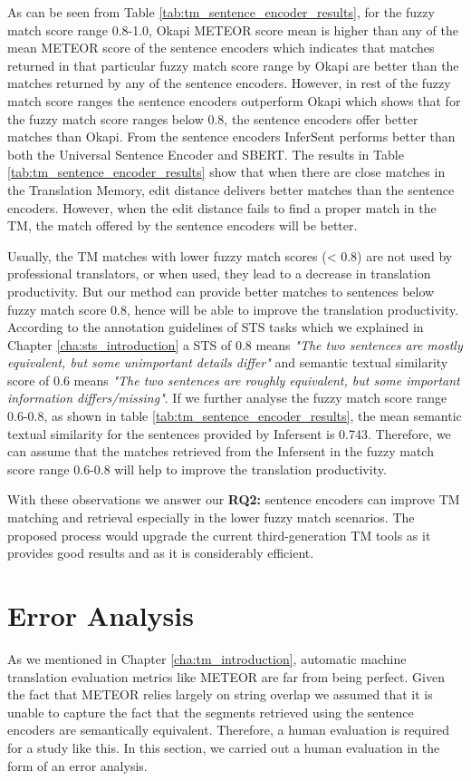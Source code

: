 As can be seen from Table \ref{tab:tm_sentence_encoder_results}, for the fuzzy match score range 0.8-1.0, Okapi METEOR score mean is higher than any of the mean METEOR score of the sentence encoders which indicates that matches returned in that particular fuzzy match score range by Okapi are better than the matches returned by any of the sentence encoders. However, in rest of the fuzzy match score ranges the sentence encoders outperform Okapi which shows that for the fuzzy match score ranges below 0.8, the sentence encoders offer better matches than Okapi. From the sentence encoders InferSent performs better than both the Universal Sentence Encoder and SBERT. The results in Table \ref{tab:tm_sentence_encoder_results} show that when there are close matches in the Translation Memory, edit distance delivers better matches than the sentence encoders. However, when the edit distance fails to find a proper match in the TM, the match offered by the sentence encoders will be better. 

Usually, the TM matches with lower fuzzy match scores (< 0.8) are not used by professional translators, or when used, they lead to a decrease in translation productivity. But our method can provide better matches to sentences below fuzzy match score 0.8, hence will be able to improve the translation productivity. According to the annotation guidelines of STS tasks which we explained in Chapter \ref{cha:sts_introduction} a STS of 0.8 means \textit{"The two sentences are mostly equivalent, but some unimportant details differ"} and semantic textual similarity score of 0.6 means \textit{"The two sentences are roughly equivalent, but some
important information differs/missing"}. If we further analyse the fuzzy match score range 0.6-0.8, as shown in table \ref{tab:tm_sentence_encoder_results}, the mean semantic textual similarity for the sentences provided by Infersent is 0.743. Therefore, we can assume that the matches retrieved from the Infersent in the fuzzy match score range 0.6-0.8 will help to improve the translation productivity.


With these observations we answer our \textbf{RQ2:} sentence encoders can improve TM matching and retrieval especially in the lower fuzzy match scenarios. The proposed process would upgrade the current third-generation TM tools as it provides good results and as it is considerably efficient.


\section{Error Analysis}
\label{sec:tm_sentence_encoders_error}
As we mentioned in Chapter \ref{cha:tm_introduction}, automatic machine translation evaluation metrics like METEOR are far from being perfect. Given the fact that METEOR relies largely on string overlap we assumed that it is unable to capture the fact that the segments retrieved using the sentence encoders are semantically equivalent. Therefore, a human evaluation is required for a study like this. In this section, we carried out a human evaluation in the form of an error analysis.

